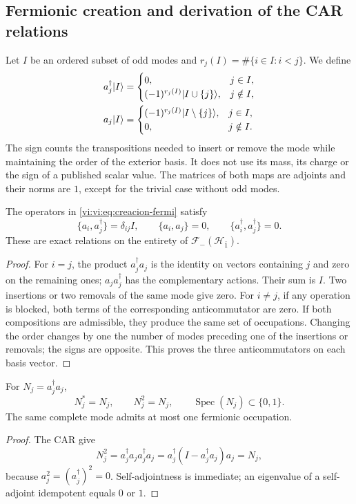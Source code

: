 \subsection{Fermionic creation and derivation of the CAR relations}
\label{vi:vi:subsec:car-construccion}

Let \(I\) be an ordered subset of odd modes and
\(r_j(I)=\#\{i\in I:i<j\}\). We define
\begin{align}
 a_j^\dagger|I\rangle&=
 \begin{cases}
 0,&j\in I,\\
 (-1)^{r_j(I)}|I\cup\{j\}\rangle,&j\notin I,
 \end{cases}\notag\\
 a_j|I\rangle&=
 \begin{cases}
 (-1)^{r_j(I)}|I\setminus\{j\}\rangle,&j\in I,\\
 0,&j\notin I.
 \end{cases}
 \label{vi:vi:eq:creacion-fermi}
\end{align}
The sign counts the transpositions needed to insert or remove
the mode while maintaining the order of the exterior basis. It does not use its mass,
its charge or the sign of a published scalar value. The matrices of
both maps are adjoints and their norms are \(1\), except for the
trivial case without odd modes.

\begin{theorem}
\label{vi:vi:thm:car-construidas}
The operators in \eqref{vi:vi:eq:creacion-fermi} satisfy
\[
 \{a_i,a_j^\dagger\}=\delta_{ij}I,\qquad
 \{a_i,a_j\}=0,\qquad
 \{a_i^\dagger,a_j^\dagger\}=0.
\]
These are exact relations on the entirety of
\(\mathcal F_-(\mathcal H_{\bar1})\).
\end{theorem}
\begin{proof}
For \(i=j\), the product \(a_j^\dagger a_j\) is the identity
on vectors containing \(j\) and zero on the remaining ones;
\(a_ja_j^\dagger\) has the complementary actions. Their sum
is \(I\). Two insertions or two removals of the same mode give zero.
For \(i\ne j\), if any operation is blocked, both terms
of the corresponding anticommutator are zero. If both compositions
are admissible, they produce the same set of occupations. Changing
the order changes by one the number of modes preceding
one of the insertions or removals; the signs are opposite. This
proves the three anticommutators on each basis vector.
\end{proof}

\begin{corollary}
\label{vi:vi:cor:pauli-ocupacion}
For \(N_j=a_j^\dagger a_j\),
\[
 N_j^*=N_j,\qquad N_j^2=N_j,\qquad
 \operatorname{Spec}(N_j)\subset\{0,1\}.
\]
The same complete mode admits at most one fermionic occupation.
\end{corollary}
\begin{proof}
The CAR give
\[
 N_j^2=a_j^\dagger a_ja_j^\dagger a_j
 =a_j^\dagger(I-a_j^\dagger a_j)a_j=N_j,
\]
because \(a_j^2=(a_j^\dagger)^2=0\). Self-adjointness is immediate;
an eigenvalue of a self-adjoint idempotent equals \(0\) or \(1\).
\end{proof}

